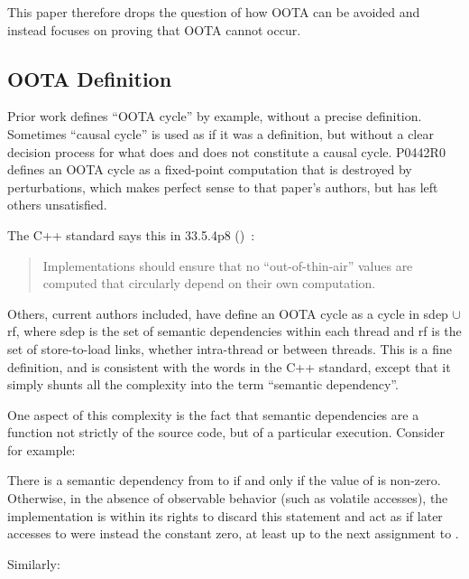 \documentclass[10]{article}
\begin{document}
This paper therefore drops the question of how OOTA can be avoided and
instead focuses on proving that OOTA cannot occur.

\subsection{OOTA Definition}
\label{sec:OOTA Definition}

Prior work defines ``OOTA cycle'' by example, without a precise
definition.
Sometimes ``causal cycle'' is used as if it was a definition, but
without a clear decision process for what does and does not
constitute a causal cycle.
P0442R0 defines an OOTA cycle as a fixed-point computation that is
destroyed by perturbations, which makes perfect sense to that paper's
authors, but has left others unsatisfied.

The C++ standard says this in 33.5.4p8
()~\cite{ThomasKoeppe2023N4950}:

\begin{quote}
	Implementations should ensure that no “out-of-thin-air” values
	are computed that circularly depend on their own computation.
\end{quote}

Others, current authors included, have define an OOTA cycle as a
cycle in sdep $\cup$ rf, where sdep is the set of semantic
dependencies within each thread and rf is the set of store-to-load
links, whether intra-thread or between threads.
This is a fine definition, and is consistent with the words in the C++
standard, except that it simply shunts all the complexity into the
term ``semantic dependency''.

One aspect of this complexity is the fact that semantic dependencies
are a function not strictly of the source code, but of a particular
execution.
Consider for example:

\begin{quote}
\end{quote}

There is a semantic dependency from  to  if and only if the
value of  is non-zero.
Otherwise, in the absence of observable behavior (such as volatile
accesses), the implementation is within its rights to discard this
statement and act as if later accesses to  were instead the
constant zero, at least up to the next assignment to .

Similarly:

\begin{quote}
\end{quote}
\end{document}
